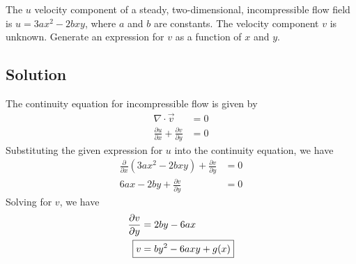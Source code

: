 \section{}
The $u$ velocity component of a steady, two-dimensional, incompressible flow field is $u = 3ax^2 - 2bxy$, where $a$ and $b$ are constants. The velocity component $v$ is unknown. Generate an expression for $v$ as a function of $x$ and $y$.

\subsection*{Solution}
The continuity equation for incompressible flow is given by
\begin{align*}
    \nabla \cdot \vec{v} &= 0 \\
    \frac{\partial u}{\partial x} + \frac{\partial v}{\partial y} &= 0
\end{align*}
Substituting the given expression for $u$ into the continuity equation, we have
\begin{align*}
    \frac{\partial}{\partial x}(3ax^2 - 2bxy) + \frac{\partial v}{\partial y} &= 0 \\
    6ax - 2by + \frac{\partial v}{\partial y} &= 0 
\end{align*}
Solving for $v$, we have
\begin{align*}
    \frac{\partial v}{\partial y} &= 2by - 6ax \\
    \Aboxed{v &= by^2 - 6axy + g(x)}
\end{align*}
